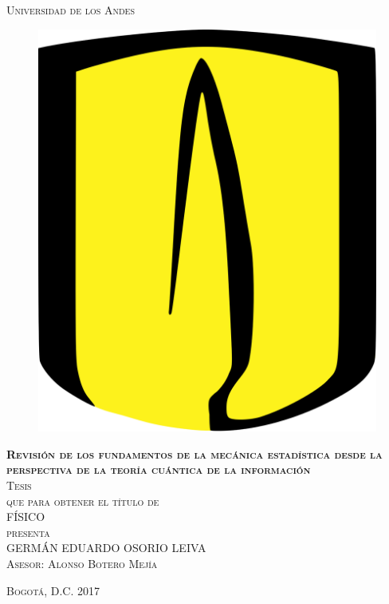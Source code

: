 \documentclass[11pt]{book}
\theoremstyle{definition}
\begin{document}
\begin{titlepage}
\begin{center}

\textsc{\Large Universidad de los Andes}\\[4em]

\begin{figure}[h]
\begin{center}
\includegraphics[scale=0.045]{ellogo.png}
\end{center}
\end{figure}

\vspace{4em}

\textsc{\huge \textbf{Revisión de los fundamentos de la mecánica estadística desde la perspectiva de la teoría cuántica de la información}}\\[4em]

\textsc{\large Tesis}\\[1em]

\textsc{que para obtener el título de}\\[1em]

\textsc{FÍSICO}\\[1em]

\textsc{presenta}\\[1em]

\textsc{\Large 	GERMÁN EDUARDO OSORIO LEIVA}\\[1em]
		
\textsc{\large Asesor: Alonso Botero Mejía}

\end{center}

\vspace*{\fill}
\textsc{Bogotá, D.C. \hspace*{\fill} 2017}

\end{titlepage}
\end{document}
